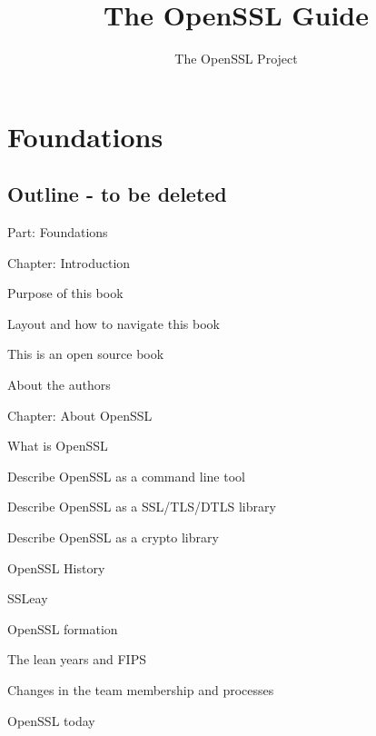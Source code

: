 \documentclass[oneside]{book}
\author{The OpenSSL Project}
\title{The OpenSSL Guide}
\begin{document}
\lstset{style=osslc}
\maketitle
\tableofcontents

\part{Foundations}

\chapter{Outline - to be deleted}

\begin{outline}
  \item{Part: Foundations}
  \begin{outline}
    \item{Chapter: Introduction}
    \begin{outline}
        \item{Purpose of this book}
        \item{Layout and how to navigate this book}
        \item{This is an open source book}
        \item{About the authors}
    \end{outline}
    \item{Chapter: About OpenSSL}
    \begin{outline}
      \item{What is OpenSSL}
      \begin{outline}
        \item{Describe OpenSSL as a command line tool}
        \item{Describe OpenSSL as a SSL/TLS/DTLS library}
        \item{Describe OpenSSL as a crypto library}
      \end{outline}
      \item{OpenSSL History}
      \begin{outline}
        \item{SSLeay}
        \item{OpenSSL formation}
        \item{The lean years and FIPS}
        \item{Changes in the team membership and processes}
        \item{OpenSSL today}
      \end{outline}
    \end{outline}

\end{outline}
\end{outline}
\end{document}
